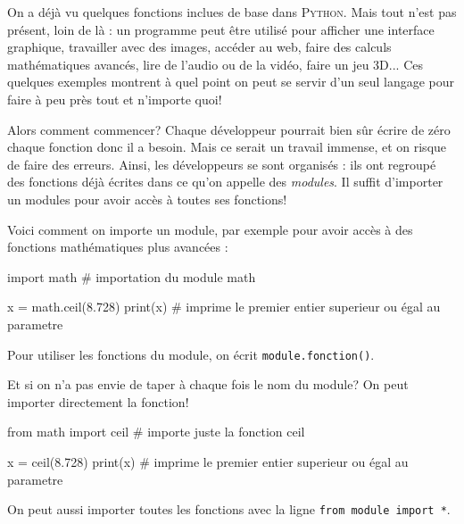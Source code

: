 On a déjà vu quelques fonctions inclues de base dans \textsc{Python}. Mais tout n'est pas présent, loin de là : un programme peut être utilisé pour afficher une interface graphique, travailler avec des images, accéder au web, faire des calculs mathématiques avancés, lire de l'audio ou de la vidéo, faire un jeu 3D... Ces quelques exemples montrent à quel point on peut se servir d'un seul langage pour faire à peu près tout et n'importe quoi!

Alors comment commencer? Chaque développeur pourrait bien sûr écrire de zéro chaque fonction donc il a besoin. Mais ce serait un travail immense, et on risque de faire des erreurs. Ainsi, les développeurs se sont organisés : ils ont regroupé des fonctions déjà écrites dans ce qu'on appelle des \textit{modules}. Il suffit d'importer un modules pour avoir accès à toutes ses fonctions!

Voici comment on importe un module, par exemple pour avoir accès à des fonctions mathématiques plus avancées :

\begin{python}
import math # importation du module math

x = math.ceil(8.728)
print(x) # imprime le premier entier superieur ou égal au parametre
\end{python}

Pour utiliser les fonctions du module, on écrit \lstinline{module.fonction()}.

Et si on n'a pas envie de taper à chaque fois le nom du module? On peut importer directement la fonction!

\begin{python}
from math import ceil # importe juste la fonction ceil

x = ceil(8.728)
print(x) # imprime le premier entier superieur ou égal au parametre
\end{python}

On peut aussi importer toutes les fonctions avec la ligne \lstinline{from module import *}.